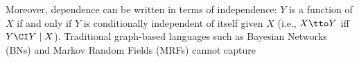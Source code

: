 Moreover, dependence can be written in terms of independence:
    $Y$ is a function of $X$ if and only if
    $Y$ is conditionally independent of itself given $X$ 
    (i.e., $X \tto Y$ iff $Y \CI Y \mid X$).
Traditional graph-based languages such as Bayesian Networks (BNs) and
    Markov Random Fields (MRFs) cannot capture 

